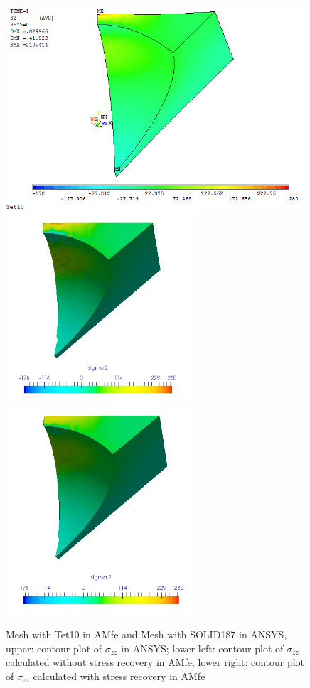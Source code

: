 \begin{figure}[htbp]
	\begin{center}
		\includegraphics[width=11cm,clip]{Tet10_Szz.png} 
		\includegraphics[width=7cm,clip]{Tet10_Szz_PD.png} 		
		\includegraphics[width=7cm,clip]{Tet10_Szz_P.png} 		
		\caption{Mesh with Tet10 in AMfe and Mesh with SOLID187 in ANSYS, upper: contour plot of $\sigma_{zz}$ in ANSYS; lower left: contour plot of $\sigma_{zz}$ calculated without stress recovery in AMfe; lower right: contour plot of $\sigma_{zz}$ calculated with stress recovery in AMfe} \label{fig: Tet10_Szz}
	\end{center}
\end{figure}
\clearpage 

